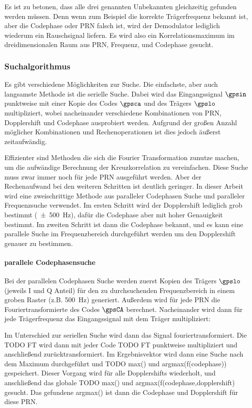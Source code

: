 Es ist zu betonen, dass alle drei genannten Unbekannten gleichzeitig gefunden werden müssen. Denn wenn zum Beispiel die korrekte Trägerfrequenz bekannt ist, aber die Codephase oder PRN falsch ist, wird der Demodulator lediglich wiederum ein Rauschsignal liefern. Es wird also ein Korrelationsmaximum im dreidimensionalen Raum aus PRN, Frequenz, und Codephase gesucht.

\subsubsection{Suchalgorithmus}
Es gibt verschiedene Möglichkeiten zur Suche. Die einfachste, aber auch langsamste Methode ist die serielle Suche. Dabei wird das Eingangssignal $\gpsin$ punktweise mit einer Kopie des Codes $\gpsca$ und des Trägers $\gpslo$ multipliziert, wobei nacheinander verschiedene Kombinationen von \gls{PRN}, Dopplershift und Codephase ausprobiert werden. Aufgrund der großen Anzahl möglicher Kombinationen und Rechenoperationen ist dies jedoch äußerst zeitaufwändig.

Effizienter sind Methoden die sich die Fourier Transformation zunutze machen, um die aufwändige Berechnung der Kreuzkorrelation zu vereinfachen. Diese Suche muss zwar immer noch für jede PRN ausgeführt werden. Aber der Rechenaufwand bei den weiteren Schritten ist deutlich geringer. 
In dieser Arbeit wird eine zweischrittige Methode aus paralleler Codephasen Suche und paralleler Frequenzsuche verwendet. Im ersten Schritt wird der Dopplershift lediglich grob bestimmt (\SI{\pm500}{\Hz}), dafür die Codephase aber mit hoher Genauigkeit bestimmt. Im zweiten Schritt ist dann die Codephase bekannt, und es kann eine parallele Suche im Frequenzbereich durchgeführt werden um den Dopplershift genauer zu bestimmen.

\paragraph{parallele Codephasensuche}
Bei der parallelen Codephasen Suche werden zuerst Kopien des Trägers $\gpslo$ (jeweils I und Q Anteil) für den zu durchsuchenden Frequenzbereich in einem groben Raster (z.B. \SI{500}{\Hz}) generiert. Außerdem wird für jede PRN die Fouriertransformierte des Codes $\gpsCA$ berechnet. Nacheinander wird dann für jede Trägerfrequenz das Eingangssignal mit dem Träger multipliziert:

Im Unterschied zur seriellen Suche wird dann das Signal  fouriertransformiert. Die TODO FT wird dann mit jeder Code TODO FT punktweise multipliziert und anschließend zurücktransformiert. Im Ergebnisvektor wird dann eine Suche nach dem Maximum durchgeführt und TODO max() und argmax(f(codephase)) gespeichert. Dieser Vorgang wird für alle Dopplershifts wiederholt, und anschließend das globale TODO max() und argmax(f(codephase,dopplershift) gesucht. Das gefundene argmax() ist dann die Codephase und Dopplershift für diese PRN.

